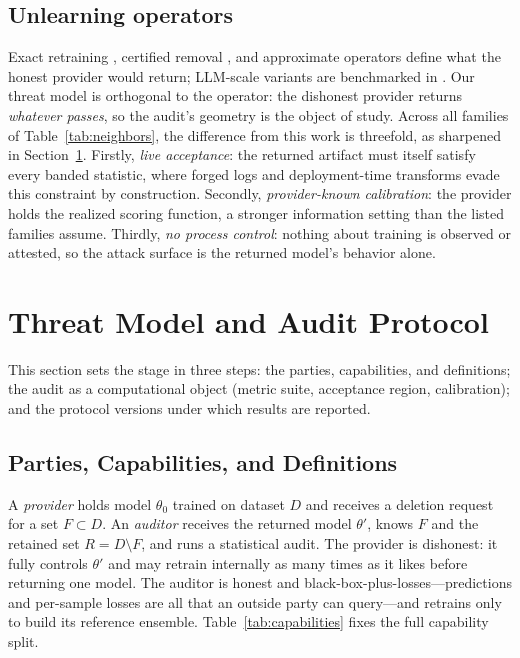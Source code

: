 \documentclass[lettersize,journal]{IEEEtran}
\begin{document}
\subsection{Unlearning operators}
Exact retraining \cite{bourtoule2021machine}, certified
removal \cite{guo2020certified}, and approximate operators
\cite{foster2024ssd, golatkar2020eternal, kurmanji2023towards}
define what the honest provider would return; LLM-scale
variants are benchmarked in \cite{maini2024tofu,
dorna2025openunlearning}. Our threat model is orthogonal to
the operator: the dishonest provider returns \emph{whatever
passes}, so the audit's geometry is the object of study.
Across all families of Table~\ref{tab:neighbors}, the
difference from this work is threefold, as sharpened in
Section~\ref{sec:threat}. Firstly, \emph{live acceptance}:
the returned artifact must itself satisfy every banded
statistic, where forged logs and deployment-time transforms
evade this constraint by construction. Secondly,
\emph{provider-known calibration}: the provider holds the
realized scoring function, a stronger information setting
than the listed families assume. Thirdly, \emph{no process
control}: nothing about training is observed or attested, so
the attack surface is the returned model's behavior alone.


\section{Threat Model and Audit Protocol}\label{sec:threat}\label{sec:audit}
This section sets the stage in three steps: the parties,
capabilities, and definitions; the audit as a computational
object (metric suite, acceptance region, calibration); and the
protocol versions under which results are reported.

\subsection{Parties, Capabilities, and Definitions}
A \emph{provider} holds model $\theta_0$ trained on dataset $D$ and
receives a deletion request for a set $F \subset D$. An \emph{auditor}
receives the returned model $\theta'$, knows $F$ and the retained set
$R = D \setminus F$, and runs a statistical audit. The provider is
dishonest: it fully controls $\theta'$ and may retrain internally as
many times as it likes before returning one model. The auditor is
honest and black-box-plus-losses---predictions and per-sample losses
are all that an outside party can query---and retrains only to build
its reference ensemble.
Table~\ref{tab:capabilities} fixes the full capability split.
\end{document}
